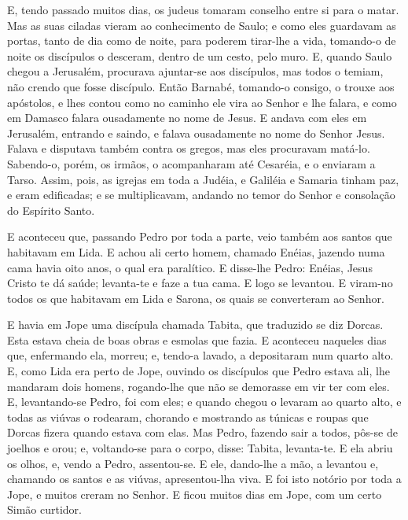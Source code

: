 E, tendo passado muitos dias, os judeus tomaram conselho entre si
para o matar. Mas as suas ciladas vieram ao conhecimento de
Saulo; e como eles guardavam as portas, tanto de dia como de noite,
para poderem tirar-lhe a vida, tomando-o de noite os
discípulos o desceram, dentro de um cesto, pelo muro. E,
quando Saulo chegou a Jerusalém, procurava ajuntar-se aos
discípulos, mas todos o temiam, não crendo que fosse discípulo.
Então Barnabé, tomando-o consigo, o trouxe aos apóstolos, e
lhes contou como no caminho ele vira ao Senhor e lhe falara, e como
em Damasco falara ousadamente no nome de Jesus. E andava com
eles em Jerusalém, entrando e saindo, e falava ousadamente no
nome do Senhor Jesus. Falava e disputava também contra os gregos,
mas eles procuravam matá-lo. Sabendo-o, porém, os irmãos, o
acompanharam até Cesaréia, e o enviaram a Tarso. Assim, pois,
as igrejas em toda a Judéia, e Galiléia e Samaria tinham paz, e eram
edificadas; e se multiplicavam, andando no temor do Senhor e
consolação do Espírito Santo.

E aconteceu que, passando Pedro por toda a parte, veio também aos
santos que habitavam em Lida. E achou ali certo homem,
chamado Enéias, jazendo numa cama havia oito anos, o qual era
paralítico. E disse-lhe Pedro: Enéias, Jesus Cristo te dá
saúde; levanta-te e faze a tua cama. E logo se levantou. E
viram-no todos os que habitavam em Lida e Sarona, os quais se
converteram ao Senhor.

E havia em Jope uma discípula chamada Tabita, que traduzido se
diz Dorcas. Esta estava cheia de boas obras e esmolas que fazia.
E aconteceu naqueles dias que, enfermando ela, morreu; e,
tendo-a lavado, a depositaram num quarto alto. E, como Lida
era perto de Jope, ouvindo os discípulos que Pedro estava ali, lhe
mandaram dois homens, rogando-lhe que não se demorasse em vir ter
com eles. E, levantando-se Pedro, foi com eles; e quando
chegou o levaram ao quarto alto, e todas as viúvas o rodearam,
chorando e mostrando as túnicas e roupas que Dorcas fizera quando
estava com elas. Mas Pedro, fazendo sair a todos, pôs-se de
joelhos e orou; e, voltando-se para o corpo, disse: Tabita,
levanta-te. E ela abriu os olhos, e, vendo a Pedro, assentou-se.
E ele, dando-lhe a mão, a levantou e, chamando os santos e as
viúvas, apresentou-lha viva. E foi isto notório por toda a
Jope, e muitos creram no Senhor. E ficou muitos dias em Jope,
com um certo Simão curtidor.

\medskip

